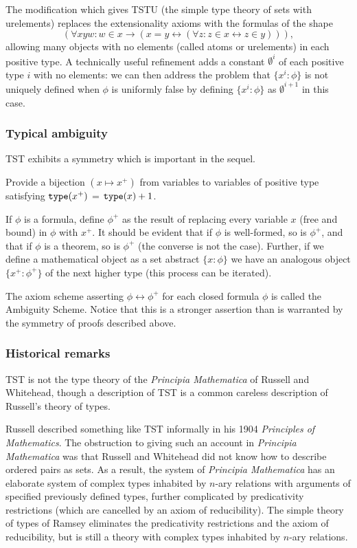 \documentclass[12pt]{article}
\begin{document}
The modification which gives TSTU (the simple type theory of sets with urelements) replaces the extensionality axioms with the formulas of the shape $$(\forall xyw:w \in x \rightarrow (x=y \leftrightarrow (\forall z:z \in x \leftrightarrow z\in y))),$$  allowing many objects with no elements (called atoms or urelements)  in each positive type.  A technically useful refinement adds a constant $\emptyset^i$ of each positive type $i$ with no elements:  we can then address the problem that $\{x^i:\phi\}$ is not uniquely defined when $\phi$ is uniformly false by defining $\{x^i:\phi\}$ as $\emptyset^{i+1}$ in this case.

\subsubsection{Typical ambiguity}

TST exhibits a symmetry which is important in the sequel.

Provide a bijection $(x \mapsto x^+)$ from variables to variables of positive type satisfying   ${\tt type}(x^+)$ = ${\tt type}(x)+1$.

If $\phi$ is a formula, define $\phi^+$ as the result of replacing every variable $x$ (free and bound) in $\phi$ with $x^+$.  It should be evident that if $\phi$ is well-formed, so is $\phi^+$,
and that if $\phi$ is a theorem, so is $\phi^+$ (the converse is not the case).  Further, if we define a mathematical object as a set abstract $\{x:\phi\}$ we have an analogous
object $\{x^+:\phi^+\}$ of the next higher type (this process can be iterated).

The axiom scheme asserting $\phi \leftrightarrow \phi^+$ for each closed formula $\phi$ is called the Ambiguity Scheme.   Notice that this is a stronger assertion than is warranted by the symmetry of proofs described above.

\subsubsection{Historical remarks}

TST is not the type theory of the {\em Principia Mathematica\/} of Russell and Whitehead, though a description of TST is a common careless description of Russell's theory of types.

Russell described something like TST informally in his 1904 {\em Principles of Mathematics\/}.  The obstruction to giving such an account in {\em Principia Mathematica\/} was that
Russell and Whitehead did not know how to describe ordered pairs as sets.  As a result, the system of {\em Principia Mathematica\/} has an elaborate system of  complex
types inhabited by $n$-ary relations with arguments of specified previously defined types, further complicated by predicativity restrictions (which are cancelled by an axiom of reducibility).
The simple theory of types of Ramsey eliminates the predicativity restrictions and the axiom of reducibility, but is still a theory with complex types inhabited by $n$-ary relations.
\end{document}

